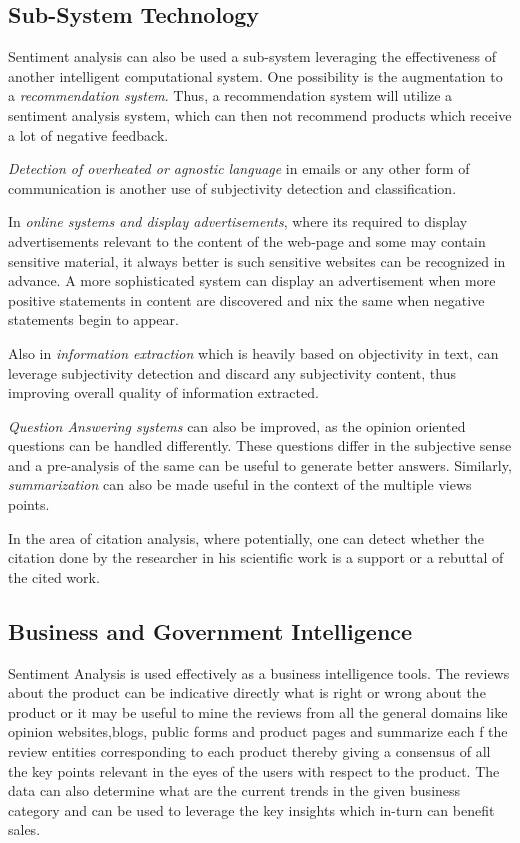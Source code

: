 \subsection{Sub-System Technology}
Sentiment analysis can also be used a sub-system leveraging the effectiveness of another intelligent computational system. One possibility is the augmentation to a \textit{recommendation system}. Thus, a recommendation system will utilize a sentiment analysis system, which can then not recommend products which receive a lot of negative feedback.  

\textit{Detection of overheated or agnostic  language} in emails or any other form of communication is another use of subjectivity detection and classification. 

In \textit{online systems and display advertisements}, where its required to display advertisements relevant to the content of the web-page and some may contain sensitive material, it always better is such sensitive websites can be  recognized in advance. A more sophisticated system can display an advertisement when more positive statements in content are discovered and nix the same when negative statements begin to appear. 

Also in \textit{information extraction} which is heavily based on objectivity in text, can leverage subjectivity detection and discard any subjectivity content, thus improving overall quality of information extracted.  

\textit{Question Answering systems} can also be improved, as the opinion oriented questions can be handled differently. These questions differ in the subjective sense and a pre-analysis of the same can be useful to generate better answers. Similarly, \textit{summarization} can also be made useful in the context of the multiple views points.  

In the area of citation analysis, where potentially, one can detect whether the citation done by the researcher in his scientific work is a support or a rebuttal of the cited work.

\subsection{Business and Government Intelligence}
Sentiment Analysis is used effectively as a business intelligence tools. The reviews about the product can be indicative directly what is right or wrong about the product or it may be useful to mine the reviews from all the general domains like opinion websites,blogs, public forms and product pages and summarize each f the review entities corresponding to each product thereby giving a consensus of all the key points relevant in the eyes of the users with respect to the product. The data can also determine what are the current trends in the given business category and can be used to leverage the key insights which in-turn can benefit sales.  

